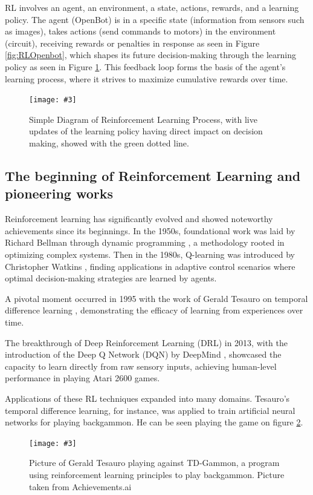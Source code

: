 \documentclass[12pt]{report}
\newcommand\insertfigure[5]{
\begin{figure}[#1]
\begin{center}
\texttt{[image: \#3]}
\end{center}
\caption{#4}
\label{#5}
\end{figure}
}
\begin{document}
RL involves an agent, an environment, a state, actions, rewards, and a learning policy. The agent (OpenBot) is in a specific state (information from sensors such as images), takes actions (send commands to motors) in the environment (circuit), receiving rewards or penalties in response as seen in Figure \ref{fig:RLOpenbot}, which shapes its future decision-making through the learning policy as seen in Figure \ref{fig:learningPolicy}. This feedback loop forms the basis of the agent's learning process, where it strives to maximize cumulative rewards over time.
\insertfigure{th}{0.4\textwidth}{learningPolicy.png}{Simple Diagram of Reinforcement Learning Process, with live updates of the learning policy having direct impact on decision making, showed with the green dotted line.}{fig:learningPolicy}



\subsection{The beginning of Reinforcement Learning and pioneering works}
\label{sub:Beginning_RL}

Reinforcement learning has significantly evolved and showed noteworthy achievements since its beginnings. In the 1950s, foundational work was laid by Richard Bellman through dynamic programming \cite{bib:richard}, a methodology rooted in optimizing complex systems. Then in the 1980s, Q-learning was introduced by Christopher Watkins \cite{bib:delayed}, finding applications in adaptive control scenarios where optimal decision-making strategies are learned by agents.


A pivotal moment occurred in 1995 with the work of Gerald Tesauro on temporal difference learning \cite{bib:Tesauro}, demonstrating the efficacy of learning from experiences over time. 


The breakthrough of Deep Reinforcement Learning (DRL) in 2013, with the introduction of the Deep Q Network (DQN) by DeepMind \cite{bib:deepmind}, showcased the capacity to learn directly from raw sensory inputs, achieving human-level performance in playing Atari 2600 games.


Applications of these RL techniques expanded into many domains. Tesauro's temporal difference learning, for instance, was applied to train artificial neural networks for playing backgammon. He can be seen playing the game on figure \ref{fig:gammon}. 

\insertfigure{th}{0.6\textwidth}{gammon.jpg}{Picture of Gerald Tesauro playing against TD-Gammon, a program using reinforcement learning principles to play backgammon. Picture taken from Achievements.ai \cite{bib:ai}}{fig:gammon}
\end{document}
